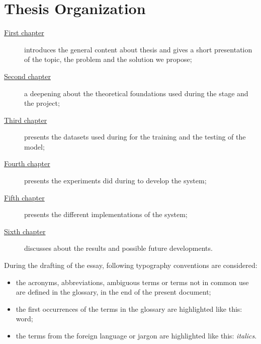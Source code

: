 \section{Thesis Organization}\label{sec:thesis-organization}
\begin{description}
    \item[{\hyperref[ch:introduction]{First chapter}}] introduces the general content about thesis and gives a short presentation of the topic, the problem and the solution we propose;

    \item[{\hyperref[ch:theoretical-foundations]{Second chapter}}] a deepening about the theoretical foundations used during the stage and the project;

    \item[{\hyperref[ch:datasets]{Third chapter}}] presents the datasets used during for the training and the testing of the model;

    \item[{\hyperref[ch:experiments]{Fourth chapter}}] presents the experiments did during to develop the system;

    \item[{\hyperref[ch:implementations]{Fifth chapter}}] presents the different implementations of the system;

    \item[{\hyperref[ch:final-discussions]{Sixth chapter}}] discusses about the results and possible future developments.
\end{description}
During the drafting of the essay, following typography conventions are considered:
\begin{itemize}
    \item the acronyms, abbreviations, ambiguous terms or terms not in common use are defined in the glossary, in the end of the present document;
    \item the first occurrences of the terms in the glossary are highlighted like this: \gls{word};
    \item the terms from the foreign language or jargon are highlighted like this: \emph{italics}.
\end{itemize}
